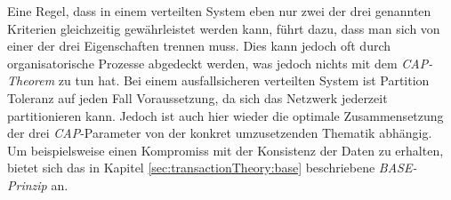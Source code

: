Eine Regel, dass in einem verteilten System eben nur zwei der drei genannten Kriterien gleichzeitig gewährleistet werden kann, führt dazu, dass man sich von einer der drei Eigenschaften trennen muss. Dies kann jedoch oft durch organisatorische Prozesse abgedeckt werden, was jedoch nichts mit dem \textit{CAP-Theorem} zu tun hat. Bei einem ausfallsicheren verteilten System ist Partition Toleranz auf jeden Fall Voraussetzung, da sich das Netzwerk jederzeit partitionieren kann. Jedoch ist auch hier wieder die optimale Zusammensetzung der drei \textit{CAP}-Parameter von der konkret umzusetzenden Thematik abhängig. Um beispielsweise einen Kompromiss mit der Konsistenz der Daten zu erhalten, bietet sich das in Kapitel \ref{sec:transactionTheory:base} beschriebene \textit{BASE-Prinzip} an.
